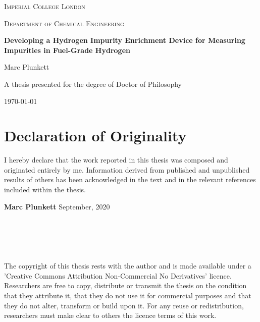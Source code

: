 \documentclass[a4paper,12pt]{report}
\begin{document}
\begin{titlepage}
	\centering
	{\scshape\Large Imperial College London \par}
	{\scshape\Large Department of Chemical Engineering\par}
	\vspace{1.5cm}
	{\LARGE\bfseries Developing a Hydrogen Impurity Enrichment Device for Measuring Impurities in Fuel-Grade Hydrogen\par}
	\vspace{2cm}
	{\Large Marc Plunkett\par}
	\vfill
	A thesis presented for the degree of Doctor of Philosophy\par

	\vfill

	{\large \today\par}
\end{titlepage}



\chapter*{Declaration of Originality}
I hereby declare that the work reported in this thesis was composed and originated entirely by me. Information derived from published and unpublished results of others has been acknowledged in the text and in the relevant references included within the thesis.

\noindent\newline
\textbf{Marc Plunkett}\newline
\noindent
September, 2020\newline
\noindent
\\
\\
\\
\\
\\
\\

The copyright of this thesis rests with the author and is made available under a 'Creative Commons Attribution Non-Commercial No Derivatives' licence. Researchers are free to copy, distribute or transmit the thesis on the condition that they attribute it, that they do not use it for commercial purposes and that they do not alter, transform or build upon it. For any reuse or redistribution, researchers must make clear to others the licence terms of this work.
\end{document}
